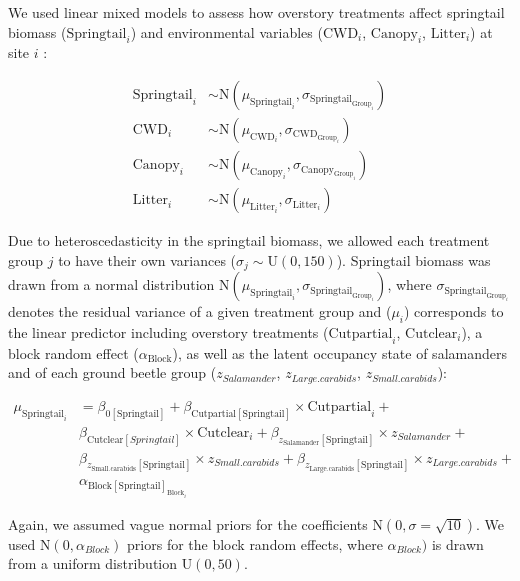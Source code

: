 We used linear mixed models to assess how overstory treatments affect springtail biomass ($\text{Springtail}_{i}$) and 
environmental variables ($\text{CWD}_{i}$, $\text{Canopy}_{i}$, $\text{Litter}_{i}$) at site $i$ :

\begin{align}
  \text{Springtail}_{i} &\sim \text{N} (\mu_{\text{Springtail}_i}, \sigma_{\text{Springtail}_{\text{Group}_i}}) \nonumber \\
  \text{CWD}_{i} &\sim \text{N} (\mu_{\text{CWD}_i}, \sigma_{\text{CWD}_{\text{Group}_i}}) \\
  \text{Canopy}_{i} &\sim \text{N} (\mu_{\text{Canopy}_i}, \sigma_{\text{Canopy}_{\text{Group}_i}}) \nonumber \\
  \text{Litter}_{i} &\sim \text{N} (\mu_{\text{Litter}_i}, \sigma_{\text{Litter}_{i}}) \nonumber 
\end{align}

Due to heteroscedasticity in the springtail biomass, we allowed each treatment group $j$ to have their own variances ($\sigma_j \sim \text{U}(0,150)$). 
Springtail biomass was drawn from a normal distribution $\text{N} (\mu_{\text{Springtail}_i}, \sigma_{\text{Springtail}_{\text{Group}_i}})$, where $\sigma_{\text{Springtail}_{\text{Group}_i}}$ denotes the 
residual variance of a given treatment group and ($\mu_{i}$) corresponds to the linear predictor including overstory treatments ($\text{Cutpartial}_i$, $\text{Cutclear}_i$), 
a block random effect ($\alpha_{\text{Block}}$), as well as the latent occupancy state of salamanders and of each ground beetle group 
($z_{Salamander}$, $z_{Large.carabids}$, $z_{Small.carabids}$):


\begin{align}
  \mu_{\text{Springtail}_i} &= \beta_{0[\text{Springtail}]} + \beta_{\text{Cutpartial}[\text{Springtail}]} \times \text{Cutpartial}_i + \nonumber\\
  &\beta_{\text{Cutclear}[Springtail]} \times \text{Cutclear}_i + \beta_{z_{\text{Salamander}}[\text{Springtail}]} \times z_{Salamander} +  \nonumber\\
  &\beta_{z_{\text{Small.carabids}}[\text{Springtail}]} \times z_{Small.carabids} + \beta_{z_{\text{Large.carabids}}[\text{Springtail}]} \times z_{Large.carabids} + \nonumber\\
  &\alpha_{\text{Block}[\text{Springtail}]_{\text{Block}_i}} \nonumber
\end{align}


Again, we assumed vague normal priors for the coefficients $\text{N}(0, \sigma = \sqrt{10})$. 
We used $\text{N}(0, \alpha_{Block})$ priors for the block random effects, where $\alpha_{Block})$ is drawn from a uniform distribution $\text{U}(0, 50)$. 


